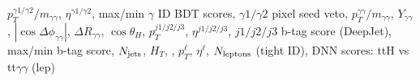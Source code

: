 $p_T^{\gamma 1/\gamma 2}/m_{\gamma\gamma}$, $\eta^{\gamma 1/\gamma 2}$, max/min $\gamma$ ID BDT scores, $\gamma 1/\gamma 2$ pixel seed veto, $p_T^{\gamma\gamma}/{m_{\gamma\gamma}}$, $Y_{\gamma\gamma}$, $|\cos{\Delta\phi_{\gamma\gamma}}|$, $\Delta R_{\gamma\gamma}$, $\cos{\theta_H}$, $p_T^{j1/j2/j3}$, $\eta^{j1/j2/j3}$, $j1/j2/j3$ b-tag score (DeepJet), max/min b-tag score, $N_{\rm{jets}}$, $H_T$, \met, $p_T^\ell$, $\eta^\ell$, $N_{\rm{leptons}}$ (tight ID), DNN scores: ttH vs tt$\gamma\gamma$ (lep)
